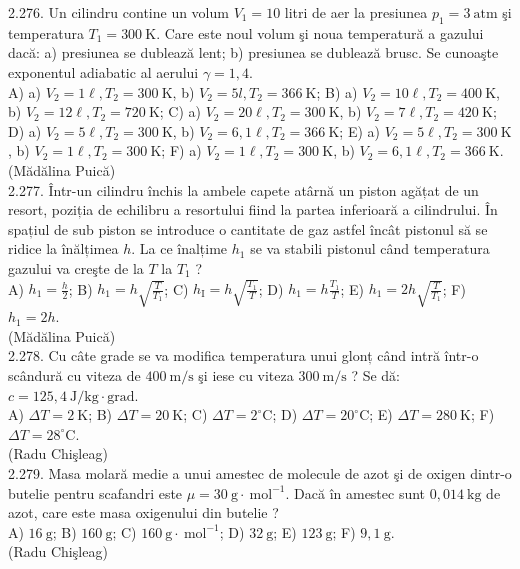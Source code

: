 2.276. Un cilindru contine un volum $V_{1}=10$ litri de aer la presiunea $p_{1}=3 \mathrm{~atm}$ şi temperatura $T_{1}=300 \mathrm{~K}$. Care este noul volum şi noua temperatură a gazului dacă: a) presiunea se dublează lent; b) presiunea se dublează brusc. Se cunoaşte exponentul adiabatic al aerului $\gamma=1,4$.\\ A) a) $V_{2}=1 \ell , T_{2}=300 \mathrm{~K}$, b) $V_{2}=5 l , T_{2}=366 \mathrm{~K}$; B) a) $V_{2}=10 \ell , T_{2}=400 \mathrm{~K}$, b) $V_{2}=12 \ell , T_{2}=720 \mathrm{~K}$; C) a) $V_{2}=20 \ell , T_{2}=300 \mathrm{~K}$, b) $V_{2}=7 \ell , T_{2}=420 \mathrm{~K}$; D) a) $V_{2}=5 \ell , T_{2}=300 \mathrm{~K}$, b) $V_{2}=6,1 \ell , T_{2}=366 \mathrm{~K}$; E) a) $V_{2}=5 \ell , T_{2}=300 \mathrm{~K}$, b) $V_{2}=1 \ell , T_{2}=300 \mathrm{~K}$; F) a) $V_{2}=1 \ell , T_{2}=300 \mathrm{~K}$, b) $V_{2}=6,1 \ell , T_{2}=366 \mathrm{~K}$.\\ (Mădălina Puică)\\

2.277. Într-un cilindru închis la ambele capete atârnă un piston agățat de un resort, poziția de echilibru a resortului fiind la partea inferioară a cilindrului. În spațiul de sub piston se introduce o cantitate de gaz astfel încât pistonul să se ridice la înălțimea $h$. La ce înalțime $h_{1}$ se va stabili pistonul când temperatura gazului va creşte de la $T$ la $T_{1}$ ?\\ A) $h_{1}=\frac{h}{2}$; B) $h_{1}=h \sqrt{\frac{T}{T_{1}}}$; C) $h_{\mathrm{I}}=h \sqrt{\frac{T_{1}}{T}}$; D) $h_{1}=h \frac{T_{1}}{T}$; E) $h_{1}=2 h \sqrt{\frac{T}{T_{1}}}$; F) $h_{1}=2 h$.\\ (Mădălina Puică)\\

2.278. Cu câte grade se va modifica temperatura unui glonț când intră într-o scândură cu viteza de $400 \mathrm{~m} / \mathrm{s}$ şi iese cu viteza $300 \mathrm{~m} / \mathrm{s}$ ? Se dă: $c=125,4 \mathrm{~J} / \mathrm{kg} \cdot \mathrm{grad}$.\\ A) $\Delta T=2 \mathrm{~K}$; B) $\Delta T=20 \mathrm{~K}$; C) $\Delta T=2^{\circ} \mathrm{C}$; D) $\Delta T=20^{\circ} \mathrm{C}$; E) $\Delta T=280 \mathrm{~K}$; F) $\Delta T=28^{\circ} \mathrm{C}$.\\ (Radu Chişleag)\\

2.279. Masa molară medie a unui amestec de molecule de azot şi de oxigen dintr-o butelie pentru scafandri este $\mu=30 \mathrm{~g} \cdot \mathrm{~mol}^{-1}$. Dacă în amestec sunt $0,014 \mathrm{~kg}$ de azot, care este masa oxigenului din butelie ?\\ A) $16 \mathrm{~g}$; B) $160 \mathrm{~g}$; C) $160 \mathrm{~g} \cdot \mathrm{~mol}^{-1}$; D) $32 \mathrm{~g}$; E) $123 \mathrm{~g}$; F) $9,1 \mathrm{~g}$.\\ (Radu Chişleag)\\

